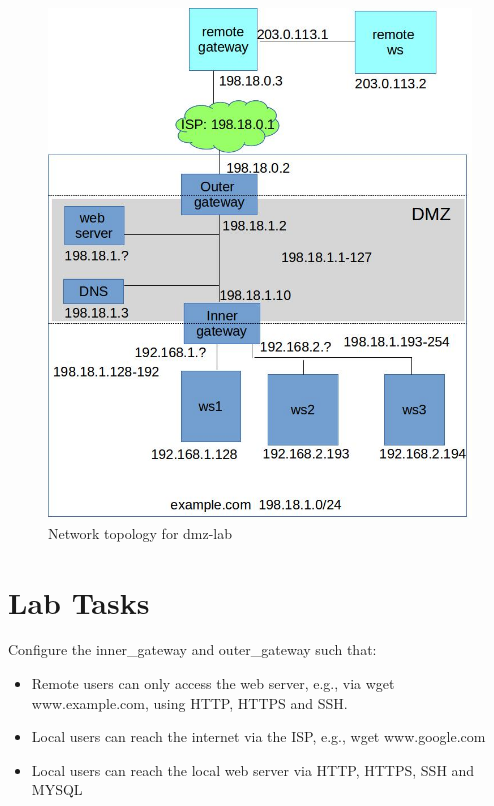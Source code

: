 \begin{figure}[h!]
\begin{center}
\includegraphics [width=\linewidth]{dmz-lab.jpg}
\end{center}
\caption{Network topology for dmz-lab}
\label{fig:topology}
\end{figure}

\section{Lab Tasks}
Configure the inner\_gateway and outer\_gateway such that:
\begin{itemize}
\item Remote users can only access the web server, e.g., via wget www.example.com, using
HTTP, HTTPS and SSH.
\item Local users can reach the internet via the ISP, e.g., wget www.google.com
\item Local users can reach the local web server via HTTP, HTTPS, SSH and MYSQL
\end{itemize}

